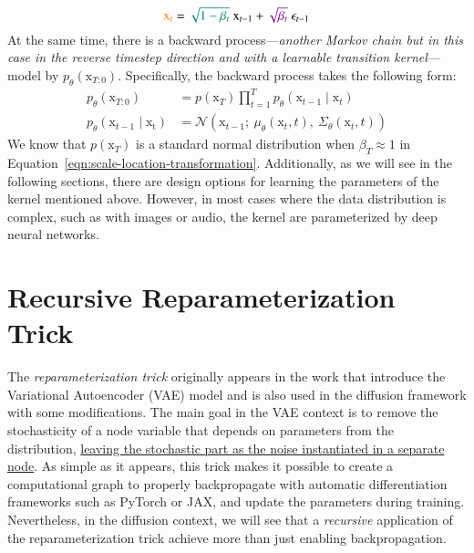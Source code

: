 \begin{equation}\label{eqn:scale-location-transformation}
    \textcolor{orange}{\mathrm{x}_{t}} = \textcolor{teal}{\sqrt{1-\beta_{t}}}~ \mathrm{x}_{t-1} + \textcolor{violet}{\sqrt{\beta_{t}}}~\mathrm{\epsilon}_{t-1}
\end{equation}
At the same time, there is a backward process---\textit{another Markov chain but in this case in the reverse timestep direction and with a learnable transition kernel}---model by $p_{\theta}(\mathrm{x}_{T:0})$. Specifically, 
the backward process takes the following form:
\begin{align}\label{eqn:backward-process}
    p_{\theta}(\mathrm{x}_{T:0}) &= p(\mathrm{x}_{T})\prod_{t=1}^{T}p_{\theta}(\mathrm{x}_{t-1}\mid\mathrm{x}_{t})
    \\
    p_{\theta}(\mathrm{x}_{t-1}\mid\mathrm{x_{t}}) &= \mathcal{N}(\mathrm{x}_{t-1};~\mu_{\theta}(\mathrm{x}_{t}, t),~\Sigma_{\theta}(\mathrm{x}_{t}, t))
\end{align}
We know that $p(\mathrm{x}_{T})$ is a standard normal distribution when $\beta_{T}\approx 1$ in Equation~\ref{eqn:scale-location-transformation}. Additionally, as we will see in the following sections, there are design options for learning 
the parameters of the kernel mentioned above. However, in most cases where the data distribution is complex, such as with images or audio, the kernel are parameterized by deep neural networks.\\

\section{Recursive Reparameterization Trick}\label{sec:reparameterization-trick}

The \textit{reparameterization trick} originally appears in the work that introduce the Variational Autoencoder (VAE) model \cite{kingma2013auto} and is also used in the diffusion framework with some modifications. The main goal in the VAE context is to remove the stochasticity of a node variable that depends on parameters from the distribution, \href{https://web.archive.org/web/20160418040123/http://dpkingma.com/wordpress/wp-content/uploads/2015/12/talk_nips_workshop_2015.pdf}{leaving the stochastic part as the noise instantiated in a separate node}. As simple as it appears, this trick makes it possible to create a computational graph to properly backpropagate with automatic differentiation frameworks such as PyTorch or JAX, and update the parameters during training. Nevertheless, in the diffusion context, we will
see that a \textit{recursive} application of the reparameterization trick achieve more than just enabling backpropagation. \\

